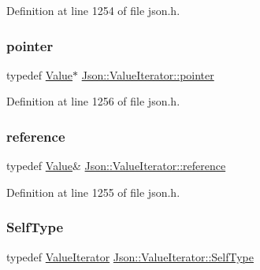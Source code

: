 Definition at line 1254 of file json.\+h.

\mbox{\label{class_json_1_1_value_iterator_acec45feb1ef1f3bf81240157d06d5432}} 
\subsubsection{\texorpdfstring{pointer}{pointer}}
{\footnotesize\ttfamily typedef \hyperlink{class_json_1_1_value}{Value}$\ast$ \hyperlink{class_json_1_1_value_iterator_acec45feb1ef1f3bf81240157d06d5432}{Json\+::\+Value\+Iterator\+::pointer}}



Definition at line 1256 of file json.\+h.

\mbox{\label{class_json_1_1_value_iterator_ae87929b4567aa00372cf602c43b57160}} 
\subsubsection{\texorpdfstring{reference}{reference}}
{\footnotesize\ttfamily typedef \hyperlink{class_json_1_1_value}{Value}\& \hyperlink{class_json_1_1_value_iterator_ae87929b4567aa00372cf602c43b57160}{Json\+::\+Value\+Iterator\+::reference}}



Definition at line 1255 of file json.\+h.

\mbox{\label{class_json_1_1_value_iterator_a23357670fdad61792670d86f62db7e16}} 
\subsubsection{\texorpdfstring{Self\+Type}{SelfType}}
{\footnotesize\ttfamily typedef \hyperlink{class_json_1_1_value_iterator}{Value\+Iterator} \hyperlink{class_json_1_1_value_iterator_a23357670fdad61792670d86f62db7e16}{Json\+::\+Value\+Iterator\+::\+Self\+Type}}



